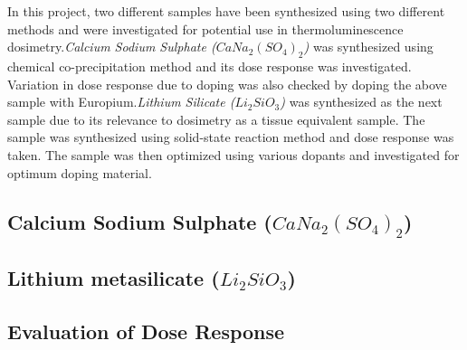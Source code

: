 \documentclass[../../Report.tex]{subfiles}
\begin{document}
    In this project, two different samples have been synthesized using two different methods and were investigated 
    for potential use in thermoluminescence dosimetry.\textit{Calcium Sodium Sulphate ($CaNa_2{(SO_4)}_2$)} was 
    synthesized using chemical co-precipitation method and its dose response was investigated. Variation in dose 
    response due to doping was also checked by doping the above sample with Europium.\textit{Lithium Silicate ($Li_2SiO_3$)} 
    was synthesized as the next sample due to its relevance to dosimetry as a tissue equivalent sample. The sample 
    was synthesized using solid-state reaction method and dose response was taken. The sample was then optimized 
    using various dopants and investigated for optimum doping material. 

    \subsection{\large Calcium Sodium Sulphate ($CaNa_2{(SO_4)}_2$)}
        

    \subsection{\large Lithium metasilicate ($Li_2SiO_3$)}
        
    \newpage
    \subsection{\large Evaluation of Dose Response}
        
\end{document}
